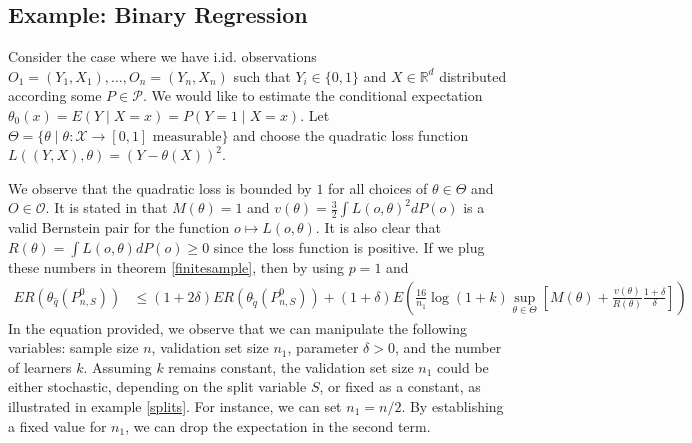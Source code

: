 \documentclass[11pt, a4paper]{article}
\theoremstyle{definition}
\theoremstyle{remark}
\newcommand{\cl}{q}
\begin{document}
\subsection{Example: Binary Regression}
Consider the case where we have i.id. observations $ O_1 = (Y_1 , X_1) , \dots , O_n = (Y_n , X_n) $ such that $ Y_i \in \{0, 1\} $ and $ X \in \mathbb{R}^{d} $ distributed according some $ P \in \mathcal{P} $. We would like to estimate the conditional expectation $ \theta_0(x) = E(Y \mid X = x) = P(Y = 1 \mid X = x) $.  Let $ \Theta = \{\theta \mid \theta : \mathcal{X} \to [0,1] \text{ measurable} \}  $ and choose the quadratic loss function $ L((Y, X), \theta) = (Y - \theta(X))^2 $.


We observe that the quadratic loss is bounded by $ 1 $ for all choices of $ \theta \in \Theta $ and $ O \in \mathcal{O} $. It is stated in \cite[7]{vaart06} that $ M(\theta) = 1 $ and $ v(\theta) = \frac{3}{2} \int L(o, \theta)^2 dP(o)  $ is a valid Bernstein pair for the function $ o \mapsto L(o, \theta)$. It is also clear that $ R(\theta) = \int L(o , \theta) d P(o) \geq 0  $ since the loss function is positive. If we plug these numbers in theorem \ref{finitesample}, then by using $ p = 1 $ and 
\begin{align*}
   ER(\theta_{\hat{\cl}}(P_{n, S}^{0})) &\leq(1 + 2 \delta) ER(\theta_{ \tilde{\cl}}(P_{n,S}^{0})) +(1 + \delta) E \left(  \frac{16}{n_1} \log (1 +k) \sup_{\theta \in \Theta} \left[ M(\theta) + \frac{v(\theta)}{R(\theta)} \frac{1 + \delta}{\delta}\right]\right)
\end{align*}
In the equation provided, we observe that we can manipulate the following variables: sample size $n$, validation set size $n_1$, parameter $\delta > 0$, and the number of learners $k$. Assuming $k$ remains constant, the validation set size $n_1$ could be either stochastic, depending on the split variable $S$, or fixed as a constant, as illustrated in example \ref{splits}. For instance, we can set $n_1 = n/2$. By establishing a fixed value for $n_1$, we can drop the expectation in the second term. 
\end{document}
